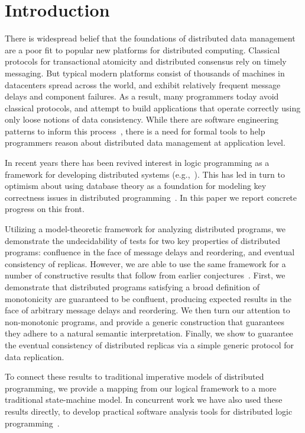 \section{Introduction}
There is widespread belief that the foundations of distributed data management are a poor fit to popular new platforms for distributed computing. Classical protocols for transactional atomicity and distributed consensus rely on timely messaging. But typical modern platforms consist of thousands of machines in datacenters spread across the world, and exhibit relatively frequent message delays and component failures.  As a result, many programmers today avoid classical protocols, and attempt to build applications that operate correctly using only loose notions of data consistency.  While there are software engineering patterns to inform this process~\cite{}, there is a need for formal tools to help programmers reason about distributed data management at application level.

In recent years there has been revived interest in logic programming as a framework for developing distributed systems (e.g.,~\cite{reactors,boom}).  This has led in turn to optimism about using database theory as a foundation for modeling key correctness issues in distributed programming~\cite{podskey-sigrec}.
In this paper we report concrete progress on this front.  

Utilizing a model-theoretic framework for analyzing distributed programs, we demonstrate the undecidability of tests for two key properties of distributed programs: confluence in the face of message delays and reordering, and eventual consistency of replicas.  However, we are able to use the same framework for a number of constructive results that follow from earlier conjectures~\cite{podskey-sigrec}.
First, we demonstrate that distributed programs satisfying a broad definition of  monotonicity are guaranteed to be confluent, producing expected results in the face of arbitrary message delays and reordering.  We then turn our attention to non-monotonic programs, and provide a generic construction that guarantees they adhere to a natural semantic interpretation.  Finally, we show to guarantee the eventual consistency of distributed replicas via a simple generic protocol for data replication.

To connect these results to traditional imperative models of distributed programming, we provide a mapping from our logical framework to a more traditional state-machine model.  In concurrent work we have also used these results directly, to develop practical software analysis tools for distributed logic programming~\cite{cidr11}.  